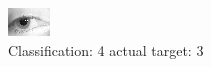 \begin{figure}[h!]
\begin{center}
\includegraphics[width=0.60\columnwidth]{figures/ID1406_class_4_target_3.png}
\end{center}
\caption{ Classification: 4 actual target: 3}
\label{fig:ID1406_class_4_target_3}
\end{figure}
